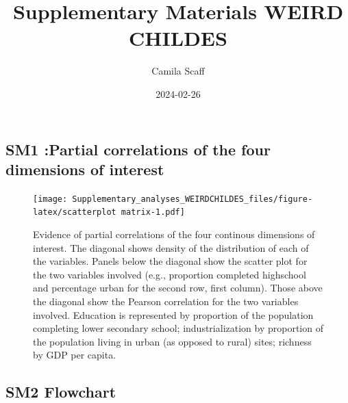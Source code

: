 \documentclass[
]{article}
\title{Supplementary Materials WEIRD CHILDES}
\author{Camila Scaff}
\date{2024-02-26}
\begin{document}
\maketitle

\hypertarget{sm1-partial-correlations-of-the-four-dimensions-of-interest}{%
\subsection{SM1 :Partial correlations of the four dimensions of
interest}\label{sm1-partial-correlations-of-the-four-dimensions-of-interest}}

\begin{figure}
\centering
\texttt{[image: Supplementary\_analyses\_WEIRDCHILDES\_files/figure-latex/scatterplot matrix-1.pdf]}
\caption{Evidence of partial correlations of the four continous
dimensions of interest. The diagonal shows density of the distribution
of each of the variables. Panels below the diagonal show the scatter
plot for the two variables involved (e.g., proportion completed
highschool and percentage urban for the second row, first column). Those
above the diagonal show the Pearson correlation for the two variables
involved. Education is represented by proportion of the population
completing lower secondary school; industrialization by proportion of
the population living in urban (as opposed to rural) sites; richness by
GDP per capita.}
\end{figure}

\hypertarget{sm2-flowchart}{%
\subsection{SM2 Flowchart}\label{sm2-flowchart}}
\end{document}
